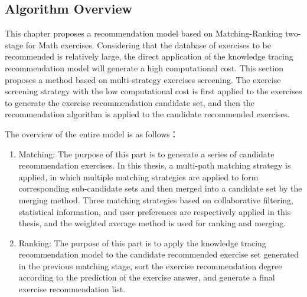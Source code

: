 \subsection{Algorithm Overview}

This chapter proposes a recommendation model based on Matching-Ranking two-stage for Math exercises. Considering that the database of exercises to be recommended is relatively large, the direct application of the knowledge tracing recommendation model will generate a high computational cost. This section proposes a method based on multi-strategy exercises screening. The exercise screening strategy with the low computational cost is first applied to the exercises to generate the exercise recommendation candidate set, and then the recommendation algorithm is applied to the candidate recommended exercises.



The overview of the entire model is as follows：
\begin{enumerate}
  \item Matching: The purpose of this part is to generate a series of candidate recommendation exercises. In this thesis, a multi-path matching strategy is applied, in which multiple matching strategies are applied to form corresponding sub-candidate sets and then merged into a candidate set by the merging method. Three matching strategies based on collaborative filtering, statistical information, and user preferences are respectively applied in this thesis, and the weighted average method is used for ranking and merging.
  \item Ranking: The purpose of this part is to apply the knowledge tracing recommendation model to the candidate recommended exercise set generated in the previous matching stage, sort the exercise recommendation degree according to the prediction of the exercise answer, and generate a final exercise recommendation list.
\end{enumerate}

